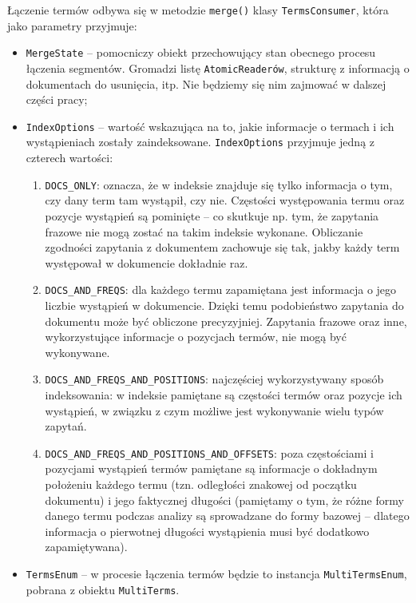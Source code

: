 Łączenie termów odbywa się w metodzie \texttt{merge()} klasy \texttt{TermsConsumer}, która jako parametry przyjmuje:
\begin{itemize}
 \item \texttt{MergeState} -- pomocniczy obiekt przechowujący stan obecnego procesu łączenia segmentów. Gromadzi listę \texttt{AtomicReaderów}, strukturę z informacją o dokumentach do usunięcia, itp. Nie będziemy się nim zajmować w dalszej części pracy;
 \item \texttt{IndexOptions} -- wartość wskazująca na to, jakie informacje o termach i ich wystąpieniach zostały zaindeksowane. \texttt{IndexOptions} przyjmuje jedną z czterech wartości:
 \begin{enumerate}
  \item \texttt{DOCS\_ONLY}: oznacza, że w indeksie znajduje się tylko informacja o tym, czy dany term tam wystąpił, czy nie. Częstości występowania termu oraz pozycje wystąpień są pominięte -- co skutkuje np. tym, że zapytania frazowe nie mogą zostać na takim indeksie wykonane. Obliczanie zgodności zapytania z dokumentem zachowuje się tak, jakby każdy term występował w dokumencie dokładnie raz.
  \item \texttt{DOCS\_AND\_FREQS}: dla każdego termu zapamiętana jest informacja o jego liczbie wystąpień w dokumencie. Dzięki temu podobieństwo zapytania do dokumentu może być obliczone precyzyjniej. Zapytania frazowe oraz inne, wykorzystujące informacje o pozycjach termów, nie mogą być wykonywane.
  \item \texttt{DOCS\_AND\_FREQS\_AND\_POSITIONS}: najczęściej wykorzystywany sposób indeksowania: w indeksie pamiętane są częstości termów oraz pozycje ich wystąpień, w związku z czym możliwe jest wykonywanie wielu typów zapytań.
  \item \texttt{DOCS\_AND\_FREQS\_AND\_POSITIONS\_AND\_OFFSETS}: poza częstościami i pozycjami wystąpień termów pamiętane są informacje o dokładnym położeniu każdego termu (tzn. odległości znakowej od początku dokumentu) i jego faktycznej długości (pamiętamy o tym, że różne formy danego termu podczas analizy są sprowadzane do formy bazowej -- dlatego informacja o pierwotnej długości wystąpienia musi być dodatkowo zapamiętywana).
 \end{enumerate}
 \item \texttt{TermsEnum} -- w procesie łączenia termów będzie to instancja \texttt{MultiTermsEnum}, pobrana z obiektu \texttt{MultiTerms}.
\end{itemize}

